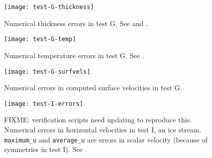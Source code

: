 \begin{figure}[ht]
\centering
\texttt{[image: test-G-thickness]}
\caption{Numerical thickness errors in test G.  See \cite{BBL} and \cite{BLKCB}.}
\label{fig:thickerrsG}
\end{figure}

\begin{figure}[ht]
\centering
\texttt{[image: test-G-temp]}
\caption{Numerical temperature errors in test G. See \cite{BBL}.}
\label{fig:temperrsG}
\end{figure}

\begin{figure}[ht]
\centering
\texttt{[image: test-G-surfvels]}
\caption{Numerical errors in computed surface velocities in test G.}
\label{fig:surfvelerrsG}
\end{figure}

\begin{figure}[ht]
\centering
\texttt{[image: test-I-errors]}
\caption{FIXME:  verification scripts need updating to reproduce this.  Numerical errors in horizontal velocities in test I, an ice stream. \texttt{maximum_u} and \texttt{average_u} are errors in scalar velocity (because of symmetries in test I).  See \cite{SchoofStream,BBssasliding}.}
\label{fig:velerrsI}
\end{figure}



